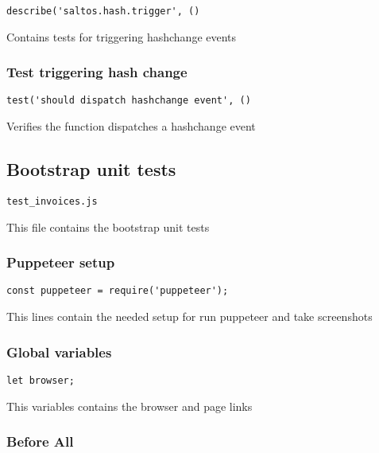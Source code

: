 \documentclass[a4paper]{article}
\begin{document}
\begin{lstlisting}
describe('saltos.hash.trigger', ()
\end{lstlisting}

Contains tests for triggering hashchange events

\hypertarget{toc220}{}
\subsubsection{Test triggering hash change}

\begin{lstlisting}
test('should dispatch hashchange event', ()
\end{lstlisting}

Verifies the function dispatches a hashchange event

\hypertarget{toc221}{}
\subsection{Bootstrap unit tests}

\begin{lstlisting}
test_invoices.js
\end{lstlisting}

This file contains the bootstrap unit tests

\hypertarget{toc222}{}
\subsubsection{Puppeteer setup}

\begin{lstlisting}
const puppeteer = require('puppeteer');
\end{lstlisting}

This lines contain the needed setup for run puppeteer and take screenshots

\hypertarget{toc223}{}
\subsubsection{Global variables}

\begin{lstlisting}
let browser;
\end{lstlisting}

This variables contains the browser and page links

\hypertarget{toc224}{}
\subsubsection{Before All}
\end{document}
